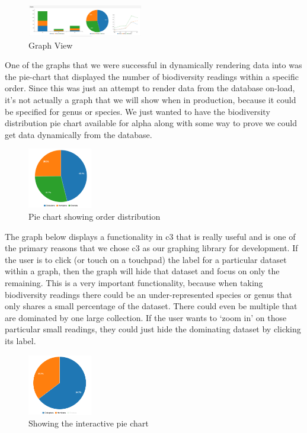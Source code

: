 \documentclass[10pt,peerreview,onecolumn,draftclsnofoot,technote]{IEEEtran}
\begin{document}
\begin{figure}[h]
\centering
\includegraphics[width=0.45\textwidth]{images/figure_6.jpg}
\captionsetup{justification=centering}
\caption{Graph View}
\end{figure}

One of the graphs that we were successful in dynamically rendering data into was the pie-chart that displayed the number of biodiversity readings within a specific order.
Since this was just an attempt to render data from the database on-load, it’s not actually a graph that we will show when in production, because it could be specified for genus or species.
We just wanted to have the biodiversity distribution pie chart available for alpha along with some way to prove we could get data dynamically from the database.

\begin{figure}[h]
\centering
\includegraphics[width=0.25\textwidth]{images/figure_7.jpg}
\captionsetup{justification=centering}
\caption{Pie chart showing order distribution}
\end{figure}

The graph below displays a functionality in c3 that is really useful and is one of the primary reasons that we chose c3 as our graphing library for development.
If the user is to click (or touch on a touchpad) the label for a particular dataset within a graph, then the graph will hide that dataset and focus on only the remaining.
This is a very important functionality, because when taking biodiversity readings there could be an under-represented species or genus that only shares a small percentage of the dataset.
There could even be multiple that are dominated by one large collection.
If the user wants to ‘zoom in’ on those particular small readings, they could just hide the dominating dataset by clicking its label.

\begin{figure}[h]
\centering
\includegraphics[width=0.25\textwidth]{images/figure_8.jpg}
\captionsetup{justification=centering}
\caption{Showing the interactive pie chart}
\end{figure}
\end{document}
